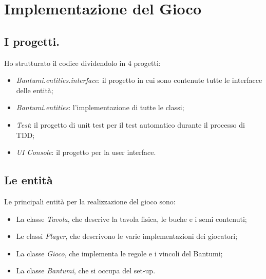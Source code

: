 \documentclass[paper=a4, fontsize=11pt]{scrartcl}	%
\numberwithin{equation}{section}															%
\numberwithin{figure}{section}																%
\numberwithin{table}{section}																%
\begin{document}
\section{Implementazione del Gioco}
\subsection{I progetti.}
Ho strutturato il codice dividendolo in 4 progetti:
\begin{itemize}
	\item \textit{Bantumi.entities.interface}: il progetto in cui sono contenute tutte le interfacce delle entit\`a;
	\item \textit{Bantumi.entities}: l'implementazione di tutte le classi;
	\item \textit{Test}: il progetto di unit test per il test automatico durante il processo di TDD;
	\item \textit{UI Console}: il progetto per la user interface.
\end{itemize}

\subsection{Le entit\`a}
Le principali entit\`a per la realizzazione del gioco sono:
\begin{itemize}
	\item La classe \textit{Tavola}, che descrive la tavola fisica, le buche e i semi contenuti;
	\item Le classi \textit{Player}, che descrivono le varie implementazioni dei giocatori;
	\item La classe \textit{Gioco}, che implementa le regole e i vincoli del Bantumi;
	\item La classe \textit{Bantumi}, che si occupa del set-up.
\end{itemize}
\end{document}
